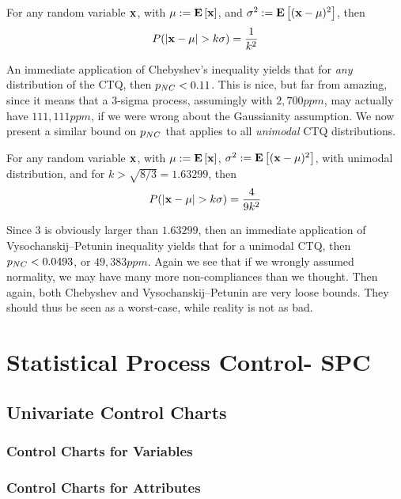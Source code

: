 \documentclass[12pt,a4paper]{report}
\begin{document}
\begin{theorem}
For any random variable $\mathbf{x}$, with $\mu:=\mathbf{E}\left[ \mathbf{x} \right]$, and $\sigma^2:=\mathbf{E}\left[ (\mathbf{x}-\mu)^2 \right]$, then
\begin{align}
	P(|\x-\mu|>k\sigma)=\frac{1}{k^2}
\end{align}
\end{theorem}
An immediate application of Chebyshev's inequality yields that for \emph{any} distribution of the CTQ, then $p_{NC}<0.11$.
This is nice, but far from amazing, since it means that a 3-sigma process, assumingly with $2,700 ppm$, may actually have $111,111 ppm$, if we were wrong about the Gaussianity assumption.
We now present a similar bound on $p_{NC}$ that applies to all \emph{unimodal} CTQ distributions.

\begin{theorem}
For any random variable $\mathbf{x}$, with $\mu:=\mathbf{E}\left[ \mathbf{x} \right]$, $\sigma^2:=\mathbf{E}\left[ (\mathbf{x}-\mu)^2 \right]$, with unimodal distribution, and for $k>\sqrt{8/3}=1.63299$, then 
\begin{align}
	P(|\x-\mu|>k\sigma)=\frac{4}{9 k^2}
\end{align}
\end{theorem}
Since $3$ is obviously larger than $1.63299$, then an immediate application of Vysochanskij–Petunin inequality yields that for a unimodal CTQ, then $p_{NC}<0.0493$, or $49,383 ppm$.
Again we see that if we wrongly assumed normality, we may have many more non-compliances than we thought. Then again, both Chebyshev and Vysochanskij–Petunin are very loose bounds. They should thus be seen as a worst-case, while reality is not as bad.



\chapter{Statistical Process Control- SPC}
\section{Univariate Control Charts}
\subsection{Control Charts for Variables}
\subsection{Control Charts for Attributes}
\end{document}
